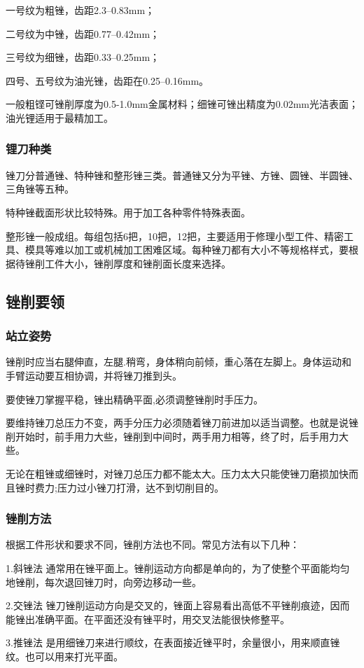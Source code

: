 \documentclass{ctexbook}
\begin{document}
一号纹为粗锉，齿距2.3--0.83mm；

二号纹为中锉，齿距0.77--0.42mm；

三号纹为细锉，齿距0.33--0.25mm；

四号、五号纹为油光锉，齿距在0.25--0.16mm。

一般粗铿可锉削厚度为0.5-1.0mm金属材料；细锉可锉出精度为0.02mm光洁表面；油光锂适用于最精加工。
\subsubsection{锂刀种类}
锉刀分普通锉、特种锉和整形锉三类。普通锉又分为平锉、方锉、圆锉、半圆锉、三角锉等五种。

特种锉截面形状比较特殊。用于加工各种零件特殊表面。

整形锉一般成组。每组包括6把，10把，12把，主要适用于修理小型工件、精密工具、模具等难以加工或机械加工困难区域。每种锉刀都有大小不等规格样式，要根据待锉削工件大小，锉削厚度和锉削面长度来选择。
\subsection{锉削要领}
\subsubsection{站立姿势}
锉削时应当右腿伸直，左腿.稍弯，身体稍向前倾，重心落在左脚上。身体运动和手臂运动要互相协调，并将锉刀推到头。

要使锉刀掌握平稳，锉出精确平面,必须调整锉削时手压力。

要维持锉刀总压力不变，两手分压力必须随着锉刀前进加以适当调整。也就是说锉削开始时，前手用力大些，锉削到中间时，两手用力相等，终了时，后手用力大些。

无论在粗锉或细锉时，对锉刀总压力都不能太大。压力太大只能使锉刀磨损加快而且锉时费力;压力过小锉刀打滑，达不到切削目的。
\subsubsection{锉削方法}
根据工件形状和要求不同，锉削方法也不同。常见方法有以下几种：

1.斜锉法 通常用在锉平面上。锉削运动方向都是单向的，为了使整个平面能均匀地锉削，每次退回锉刀时，向旁边移动一些。

2.交锉法 锉刀锉削运动方向是交叉的，锉面上容易看出高低不平锉削痕迹，因而能锉出准确平面。在平面还没有锉平时，用交叉法能很快修整平。

3.推锉法 是用细锉刀来进行顺纹，在表面接近锉平时，余量很小，用来顺直锉纹。也可以用来打光平面。
\end{document}
